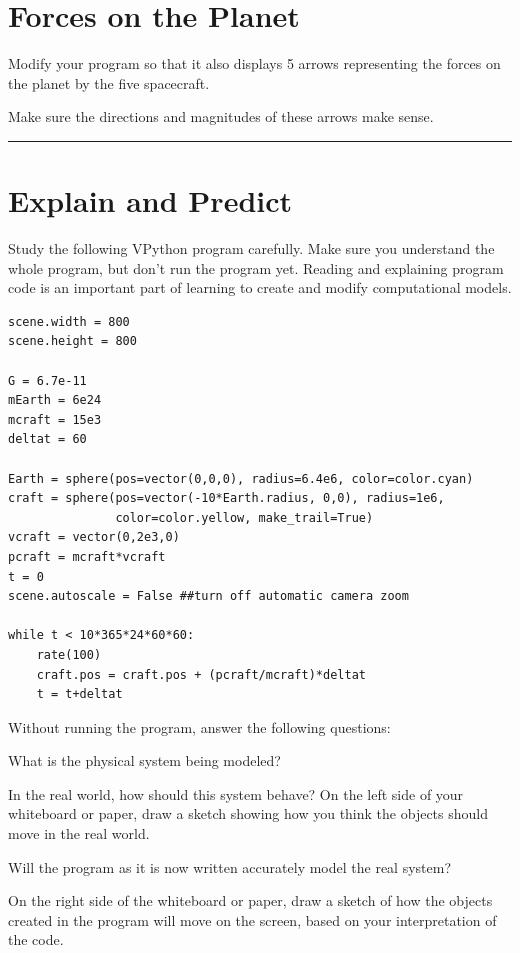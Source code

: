 \documentclass[11pt]{article}
\begin{document}


\section{Forces on the Planet}


 

\begin{compactitem}[\color{MIRed}$\Rightarrow$]
\item Modify your program so that it also displays 5 arrows representing the forces on the planet by the five spacecraft.
\item Make sure the directions and magnitudes of these arrows make sense.
\end{compactitem}

\vspace{24pt}
\hrule

\newpage

\section{Explain and Predict}

Study the following VPython program carefully. Make sure you understand the whole program, but don't run the program yet. Reading and explaining program code is an important part of learning to create and modify computational models.

\color{CodeColor}
\begin{Verbatim}[frame=single]
scene.width = 800
scene.height = 800

G = 6.7e-11
mEarth = 6e24
mcraft = 15e3
deltat = 60

Earth = sphere(pos=vector(0,0,0), radius=6.4e6, color=color.cyan)
craft = sphere(pos=vector(-10*Earth.radius, 0,0), radius=1e6,
               color=color.yellow, make_trail=True)
vcraft = vector(0,2e3,0)
pcraft = mcraft*vcraft
t = 0
scene.autoscale = False ##turn off automatic camera zoom

while t < 10*365*24*60*60:
    rate(100)     
    craft.pos = craft.pos + (pcraft/mcraft)*deltat
    t = t+deltat
\end{Verbatim}
\color{black}

Without running the program, answer the following questions:

\begin{compactitem}[\color{MIRed}$\Rightarrow$]
\item What is the physical system being modeled? 
\item In the real world, how should this system behave? On the left side of your whiteboard or paper, draw a sketch showing how you think the objects should move in the real world. 
\item Will the program as it is now written accurately model the real system?
\item On the right side of the whiteboard or paper, draw a sketch of how the objects created in the program will move on the screen, based on your interpretation of the code.
\end{compactitem}
\end{document}
